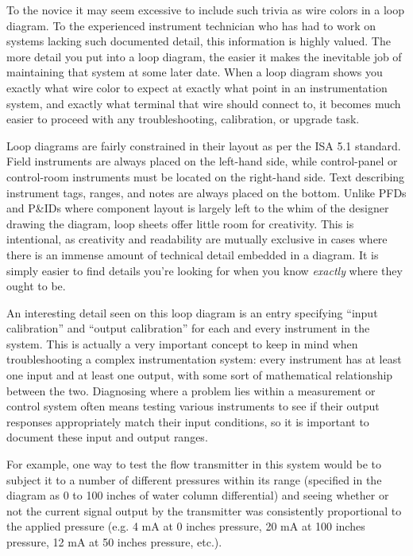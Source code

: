 To the novice it may seem excessive to include such trivia as wire colors in a loop diagram.  To the experienced instrument technician who has had to work on systems lacking such documented detail, this information is highly valued.  The more detail you put into a loop diagram, the easier it makes the inevitable job of maintaining that system at some later date.  When a loop diagram shows you exactly what wire color to expect at exactly what point in an instrumentation system, and exactly what terminal that wire should connect to, it becomes much easier to proceed with any troubleshooting, calibration, or upgrade task.

\vskip 10pt

Loop diagrams are fairly constrained in their layout as per the ISA 5.1 standard.  Field instruments are always placed on the left-hand side, while control-panel or control-room instruments must be located on the right-hand side.  Text describing instrument tags, ranges, and notes are always placed on the bottom.  Unlike PFDs and P\&IDs where component layout is largely left to the whim of the designer drawing the diagram, loop sheets offer little room for creativity.  This is intentional, as creativity and readability are mutually exclusive in cases where there is an immense amount of technical detail embedded in a diagram.  It is simply easier to find details you're looking for when you know \textit{exactly} where they ought to be.

\vskip 10pt

An interesting detail seen on this loop diagram is an entry specifying ``input calibration'' and ``output calibration'' for each and every instrument in the system.  This is actually a very important concept to keep in mind when troubleshooting a complex instrumentation system: every instrument has at least one input and at least one output, with some sort of mathematical relationship between the two.  Diagnosing where a problem lies within a measurement or control system often means testing various instruments to see if their output responses appropriately match their input conditions, so it is important to document these input and output ranges.

For example, one way to test the flow transmitter in this system would be to subject it to a number of different pressures within its range (specified in the diagram as 0 to 100 inches of water column differential) and seeing whether or not the current signal output by the transmitter was consistently proportional to the applied pressure (e.g. 4 mA at 0 inches pressure, 20 mA at 100 inches pressure, 12 mA at 50 inches pressure, etc.).

